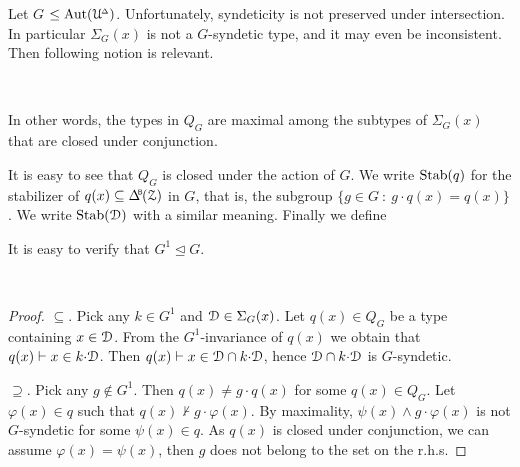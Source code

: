 Let \emph{$G$\/} $\le{\rm Aut}(\EuScript U\kern-.2ex^{\scriptscriptstyle\Delta})$.
Unfortunately, syndeticity is not preserved under intersection.
In particular $\Sigma_G(x)$ is not a $G$-syndetic type, and it may even be inconsistent.
Then following notion is relevant.

\begin{definition}\label{def_Q}\ 

  \smallskip

  In other words, the types in $Q_G$ are maximal among the subtypes of $\Sigma_G(x)$ that are closed under conjunction.
\end{definition}

It is easy to see that $Q_G$ is closed under the action of $G$.
We write ${\rm Stab}(q)$ for the stabilizer of $q(x)\subseteq\BDelta(\Z)$ in $G$, that is, the subgroup $\{g\in G\ :\ g{\cdot}q(x)=q(x)\}$.
We write ${\rm Stab}(\EuScript D)$ with a similar meaning.
Finally we define


It is easy to verify that $G^1\trianglelefteq G$.

\begin{proposition}\label{prop_StabQ}\ \smallskip

  \smallskip
\end{proposition}

\begin{proof}
  $\subseteq$.
  Pick any $k\in G^1$ and $\EuScript D\in\Sigma_G(x)$.
  Let $q(x)\in Q_G$ be a type containing $x\in\EuScript D$.
  From the $G^1$-invariance of $q(x)$ we obtain that $q(x)\vdash x\in k{\cdot}\EuScript D$.
  Then $q(x)\vdash x\in \EuScript D\cap k{\cdot}\EuScript D$, hence $\EuScript D\cap k{\cdot}\EuScript D$ is $G$-syndetic.

  $\supseteq$.
  Pick any $g\notin G^1$.
  Then $q(x)\neq g{\cdot}q(x)$ for some $q(x)\in Q_G$.
  Let $\varphi(x)\in q$ such that $q(x)\not\vdash g{\cdot}\varphi(x)$.
  By maximality, $\psi(x)\wedge g{\cdot}\varphi(x)$ is not $G$-syndetic for some $\psi(x)\in q$.
  As $q(x)$ is closed under conjunction, we can assume $\varphi(x)=\psi(x)$, then $g$ does not belong to the set on the r.h.s.
\end{proof}


\begin{definition}\label{def_P}\ 

  \smallskip

  
\end{definition}


